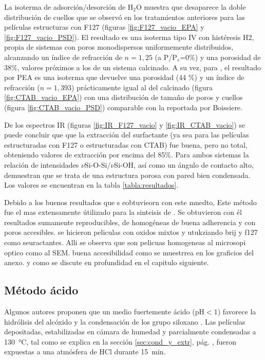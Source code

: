 		 La isoterma de adsorción/desorción de H$_2$O muestra que desaparece la doble distribución de cuellos que se observó en los tratamientos anteriores para las películas estructuras con F127 (figuras \ref{fig:F127_vacio_EPA} y \ref{fig:F127_vacio_PSD}). El resultado es una isoterma tipo IV con histéresis H2, propia de sistemas con poros monodispersos uniformemente distribuidos, alcanzando un índice de refracción de $n=1,25$ (a P/P$_s$=0\%) y una porosidad de $38\%$, valores próximos a los de un sistema calcinado. A su vez, para \pdmC, el resultado por PEA es una isoterma que devuelve una porosidad (44 \%) y un índice de refracción ($n=1,393$) prácticamente igual al del calcinado (figura \ref{fig:CTAB_vacio_EPA}) con una distribución de tamaño de poros y cuellos (figura \ref{fig:CTAB_vacio_PSD}) comparable con la reportada por Boissiere\cite{Boissiere2005}.

		 De los espectros IR  (figuras \ref{fig:IR_F127_vacio} y \ref{fig:IR_CTAB_vacio}) se puede concluir que que la extracción del surfactante (ya sea para las películas estructuradas con F127 o estructuradas con CTAB) fue buena, pero no total, obteniendo valores de extracción por encima del 85\%. Para ambos sistemas la relación de intensidades $\nu{\text{Si-O-Si/}}\nu{\text{Si-OH}}$, así como un ángulo de contacto alto, demuestran que se trata de una estructura porosa con pared bien condensada. Los valores se encuentran en la tabla \ref{tabla:resultados}.

		 Debido a los buenos resultados que s eobtuvieorn con este mnedto, Este método fue el mas extensamente útilizado para la sinteisis de \pdm. Se obtuvieron con él resultados sumamente reproducibles, de \pdm\space homogéneas de buena adherencia y con poros accesibles. se hicieron peliculas con oxidos mixtos y utukziando brij y f127 como seuractantes. Alli se observa que son pelicuas homogeneas al microsopi optico como al SEM. buena accesibilidad como se muestrrea en los graficios del anexo. y como se discute en profundidad en el capitulo siguiente. 

	 \subsection{Método ácido}

	 	 Algunos autores proponen que un medio fuertemente ácido (pH$<1$) favorece la hidrólisis del alcóxido y la condensación de los grupo siloxano \cite{Soler-Illia2011,Doshi2000a,Huo1996,Boissiere2000,Beck1992}. Las películas depositadas, estabilizadas en cámara de humedad y  parcialmente condensadas a \SI{130}{\celsius}, tal como se explica en la sección \ref{sec:cond_y_extr}, pág. \pageref{sec:cond_y_extr}, fueron expuestas a una atmósfera de HCl durante \SI{15}{\minute}. 

